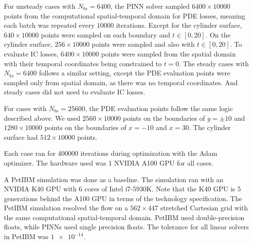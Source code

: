 For unsteady cases with $N_{bs}=\num{6400}$, the PINN solver sampled $\num{6400}\times \num{10000}$ points from the computational spatial-temporal domain for PDE losses, meaning each batch was repeated every $\num{10000}$ iterations.
Except for the cylinder surface, $640\times \num{10000}$ points were sampled on each boundary and $t\in[0, 20]$.
On the cylinder surface, $256\times \num{10000}$ points were sampled and also with $t\in[0, 20]$.
To evaluate IC losses, $\num{6400}\times \num{10000}$ points were sampled from the spatial domain with their temporal coordinates being constrained to $t=0$.
The steady cases with $N_{bs}=\num{6400}$ follows a similar setting, except the PDE evaluation points were sampled only from spatial domain, as there was no temporal coordinates.
And steady cases did not need to evaluate IC losses.

For cases with $N_{bs}=\num{25600}$, the PDE evaluation points follow the same logic described above.
We used $\num{2560}\times \num{10000}$ points on the boundaries of $y=\pm 10$ and $\num{1280}\times \num{10000}$ points on the boundaries of $x=-10$ and $x=30$.
The cylinder surface had $512\times \num{10000}$ points.

Each case ran for \num{400000} iterations during optimization with the Adam optimizer.
The hardware used was 1 NVIDIA A100 GPU for all cases.

A PetIBM simulation was done as a baseline.
The simulation ran with an NVIDIA K40 GPU with 6 cores of Intel i7-5930K.
Note that the K40 GPU is 5 generations behind the A100 GPU in terms of the technology specification.
The PetIBM simulation resolved the flow on a $562 \times 447$ stretched Cartesian grid with the same computational spatial-temporal domain.
PetIBM used double-precision floats, while PINNs used single precision floats.
The tolerance for all linear solvers in PetIBM was $\num{1e-14}$.
